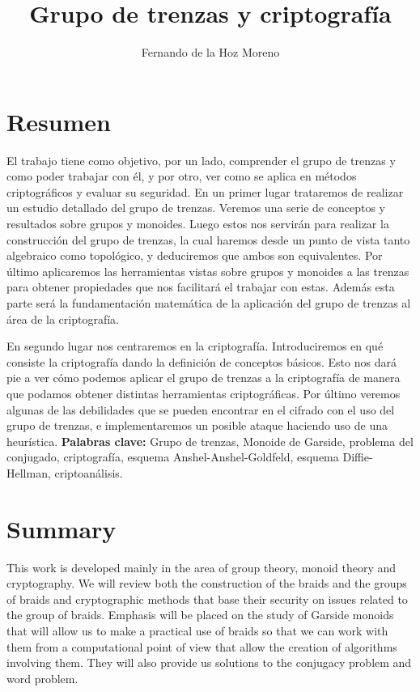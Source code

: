 \documentclass[12pt]{book}
\title{Grupo de trenzas y criptografía}
\author{Fernando de la Hoz Moreno}
\date{}
\theoremstyle{definition}
\begin{document}
 




\newpage
\tableofcontents
\newpage
\chapter*{Resumen}
El trabajo tiene como objetivo, por un lado, comprender el grupo de trenzas y como poder trabajar con él, y por otro, ver como se aplica en métodos criptográficos y evaluar su seguridad. 
En un primer lugar trataremos de realizar un estudio detallado del grupo de trenzas. Veremos una serie de conceptos y resultados sobre grupos y monoides. Luego estos nos servirán para realizar la construcción del grupo de trenzas, la cual haremos desde un punto de vista tanto algebraico como topológico, y deduciremos que ambos son equivalentes. Por último aplicaremos las herramientas vistas sobre grupos y monoides a las trenzas para obtener propiedades que nos facilitará el trabajar con estas. Además esta parte será la fundamentación matemática de la aplicación del grupo de trenzas al área de la criptografía.

En segundo lugar nos centraremos en la criptografía. Introduciremos en qué consiste la criptografía dando la definición de conceptos básicos. Esto nos dará pie a ver cómo podemos aplicar el grupo de trenzas a la criptografía de manera que podamos obtener distintas herramientas criptográficas. Por último veremos algunas de las debilidades que se pueden encontrar en el cifrado con el uso del grupo de trenzas, e implementaremos un posible ataque haciendo uso de una heurística.
\newline
\newline
\textbf{Palabras clave:} Grupo de trenzas, Monoide de Garside, problema del conjugado, criptografía, esquema Anshel-Anshel-Goldfeld, esquema Diffie-Hellman, criptoanálisis.

\chapter*{Summary}


This work is developed mainly in the area of group theory, monoid theory and cryptography.  We will review both the construction of the braids and the groups of braids and cryptographic methods that base their security on issues related to the group of braids. Emphasis will be placed on the study of Garside monoids that will allow us to make a practical use of braids so that we can work with them from a computational point of view that allow the creation of algorithms involving them. They will also provide us solutions to the conjugacy problem and word problem.
\end{document}
